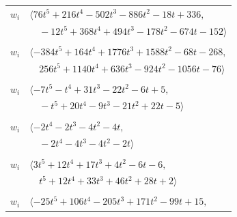\documentclass[11pt]{article}
\begin{document}
\begin{longtable}{@{}ll@{}}
$w_i$ & $\langle 76t^{5}+216t^{4}-502t^{3}-886t^{2}-18t+336,$\\
 & $\quad -12t^{5}+368t^{4}+494t^{3}-178t^{2}-674t-152\rangle$\\
\addlinespace[2pt]
\multicolumn{2}{@{}p{0.97\textwidth}@{}}{$i=37$, $D_i=1$, $\rho_{ij}$: $3{:}2, \allowbreak 5{:}3, \allowbreak 6{:}1, \allowbreak 12{:}1, \allowbreak 15{:}2, \allowbreak 20{:}2, \allowbreak 23{:}1, \allowbreak 26{:}3, \allowbreak 28{:}3, \allowbreak 30{:}2, \allowbreak 31{:}3, \allowbreak 44{:}3, \allowbreak 46{:}2, \allowbreak 48{:}1, \allowbreak 57{:}3$}\\
$w_i$ & $\langle -384t^{5}+164t^{4}+1776t^{3}+1588t^{2}-68t-268,$\\
 & $\quad 256t^{5}+1140t^{4}+636t^{3}-924t^{2}-1056t-76\rangle$\\
\addlinespace[2pt]
\multicolumn{2}{@{}p{0.97\textwidth}@{}}{$i=38$, $D_i=1$, $\rho_{ij}$: $0{:}2, \allowbreak 3{:}3, \allowbreak 4{:}2, \allowbreak 7{:}1, \allowbreak 15{:}3, \allowbreak 24{:}1, \allowbreak 29{:}1, \allowbreak 40{:}1, \allowbreak 45{:}3, \allowbreak 46{:}2$}\\
$w_i$ & $\langle -7t^{5}-t^{4}+31t^{3}-22t^{2}-6t+5,$\\
 & $\quad -t^{5}+20t^{4}-9t^{3}-21t^{2}+22t-5\rangle$\\
\addlinespace[2pt]
\multicolumn{2}{@{}p{0.97\textwidth}@{}}{$i=39$, $D_i=1$, $\rho_{ij}$: $0{:}1, \allowbreak 14{:}1, \allowbreak 17{:}1, \allowbreak 40{:}2, \allowbreak 46{:}3, \allowbreak 56{:}1, \allowbreak 57{:}1$}\\
$w_i$ & $\langle -2t^{4}-2t^{3}-4t^{2}-4t,$\\
 & $\quad -2t^{4}-4t^{3}-4t^{2}-2t\rangle$\\
\addlinespace[2pt]
\multicolumn{2}{@{}p{0.97\textwidth}@{}}{$i=40$, $D_i=1$, $\rho_{ij}$: $14{:}1, \allowbreak 29{:}1, \allowbreak 31{:}2, \allowbreak 36{:}2, \allowbreak 38{:}3, \allowbreak 39{:}2, \allowbreak 54{:}3, \allowbreak 56{:}1, \allowbreak 57{:}2$}\\
$w_i$ & $\langle 3t^{5}+12t^{4}+17t^{3}+4t^{2}-6t-6,$\\
 & $\quad t^{5}+12t^{4}+33t^{3}+46t^{2}+28t+2\rangle$\\
\addlinespace[2pt]
\multicolumn{2}{@{}p{0.97\textwidth}@{}}{$i=41$, $D_i=2$, $\rho_{ij}$: $1{:}3, \allowbreak 7{:}2, \allowbreak 12{:}2, \allowbreak 17{:}2, \allowbreak 20{:}2, \allowbreak 32{:}2, \allowbreak 34{:}3, \allowbreak 46{:}2, \allowbreak 54{:}2$}\\
$w_i$ & $\langle -25t^{5}+106t^{4}-205t^{3}+171t^{2}-99t+15,$\\

\end{longtable}
\end{document}
